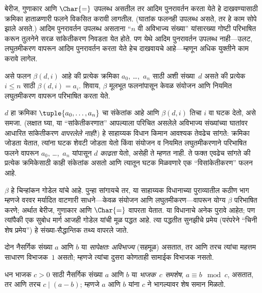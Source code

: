 \documentclass[../../../include/open-logic-section]{subfiles}
\begin{document}


बेरीज, गुणाकार आणि $\Char{=}$ उपलब्ध असतील तर आदिम पुनरावर्तन
करता येते हे दाखवण्यासाठी क्रमिका हाताळणारी फलने विकसित करावी लागतील.
(घातांक फलनही उपलब्ध असते, तर हे काम सोपे झाले असते.) आदिम
पुनरावर्तन उपलब्ध असताना ``$n$ वी अविभाज्य संख्या'' यांसारख्या
गोष्टी परिभाषित करून तुलनेने सरळ सांकेतीकरण निवडता येत होते.
पण येथे आदिम पुनरावर्तन उपलब्ध नाही---उलट, लघुतमीकरण वापरून
आदिम पुनरावर्तन करता येते हेच दाखवायचे आहे---म्हणून अधिक
युक्तीने काम करावे लागेल.

\begin{lem}
असे फलन $\beta(d,i)$ आहे की प्रत्येक क्रमिका $a_0$,
\dots,~$a_n$ साठी अशी संख्या~$d$ असते की प्रत्येक $i \le n$
साठी $\beta(d,i) = a_i$. शिवाय, $\beta$ मूलभूत फलनांपासून
केवळ संयोजन आणि नियमित लघुतमीकरण वापरून परिभाषित करता येते.
\end{lem}

$d$ हा क्रमिका $\tuple{a_0, \dots, a_n}$ चा संकेतांक आहे
आणि $\beta(d,i)$ तिचा $i$ वा घटक देतो, असे समजा.
(लक्षात घ्या, या ``सांकेतीकरणात'' आपल्याला परिचित असलेले
अविभाज्य संख्यांच्या घातांवर आधारित सांकेतीकरण \emph{वापरलेले नाही}!)
हे साहाय्यक विधान किमान आवश्यक तेवढेच सांगते: क्रमिका जोडता
येतात, त्यांना घटक शेवटी जोडता येतो किंवा संयोजन व नियमित
लघुतमीकरणाने परिभाषित फलने वापरून $a_0$, \dots,~$a_n$
यांपासून $d$ \emph{काढता} येतो, असेही ते म्हणत नाही. ते फक्त
एवढेच सांगते की प्रत्येक क्रमिकेसाठी काही संकेतांक असतो आणि
त्यातून घटक मिळवणारे एक ``विसांकेतीकरण'' फलन आहे.

$\beta$ हे चिन्हांकन गोडेल यांचे आहे. पुन्हा सांगायचे तर,
या साहाय्यक विधानाच्या पुराव्यातील कठीण भाग म्हणजे वरवर
मर्यादित वाटणारी साधने---केवळ संयोजन आणि लघुतमीकरण---वापरून
योग्य $\beta$ परिभाषित करणे; अर्थात बेरीज, गुणाकार आणि
$\Char{=}$ वापरता येतात. या विधानाचे अनेक पुरावे आहेत; पण
त्यांपैकी एक सुबोध मार्ग आजही गोडेल यांची मूळ पद्धत आहे.
त्या पद्धतीत सुनझीचे प्रमेय (परंपरेने ``चिनी शेष प्रमेय'')
हे संख्या-सैद्धान्तिक तथ्य वापरले जाते.

\begin{defn}
दोन नैसर्गिक संख्या $a$ आणि $b$ या \emph{सापेक्षतः अविभाज्य}
(सहमूळ) असतात, तर आणि तरच त्यांचा महत्तम साधारण
विभाजक~$1$ असतो; म्हणजे त्यांचा दुसरा कोणताही सामाईक विभाजक नसतो.
\end{defn}

\begin{defn}
धन भाजक $c>0$ साठी नैसर्गिक संख्या $a$ आणि $b$ या \emph{भाजक~$c$ समशेष},
$a \equiv b \mod c$, असतात, तर आणि तरच
$c \mid (a-b)$; म्हणजे $a$ आणि $b$ यांना $c$ ने भागल्यावर
शेष समान मिळतो.
\end{defn}
\end{document}
